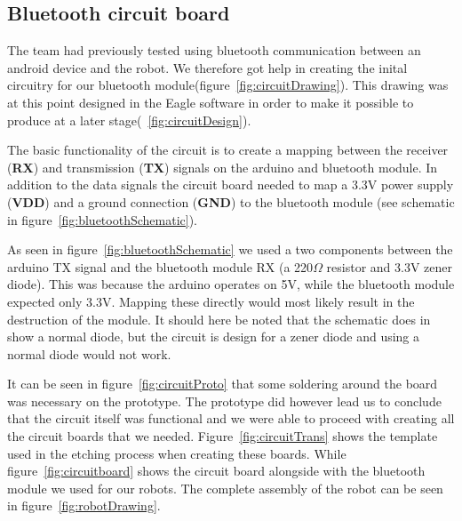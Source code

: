 \subsection*{Bluetooth circuit board}
The \chirp team had previously tested using bluetooth communication between an android device and the robot. We therefore got help in creating the inital circuitry for our bluetooth module(figure~\ref{fig:circuitDrawing}). This drawing was at this point designed in the Eagle software in order to make it possible to produce at a later stage(~\ref{fig:circuitDesign}). 

\bigskip\noindent
The basic functionality of the circuit is to create a mapping between the receiver (\textbf{RX}) and transmission (\textbf{TX}) signals on the arduino and bluetooth module. In addition to the data signals the circuit board needed to map a 3.3V power supply (\textbf{VDD}) and a ground connection (\textbf{GND}) to the bluetooth module (see schematic in figure~\ref{fig:bluetoothSchematic}).


\bigskip\noindent
As seen in figure~\ref{fig:bluetoothSchematic} we used a two components between the arduino TX signal and the bluetooth module RX (a 220$\Omega$ resistor and 3.3V zener diode). This was because the arduino operates on 5V, while the bluetooth module expected only 3.3V. Mapping these directly would most likely result in the destruction of the module. It should here be noted that the schematic does in show a normal diode, but the circuit is design for a zener diode and using a normal diode would not work.

\bigskip\noindent
It can be seen in figure~\ref{fig:circuitProto} that some soldering around the board was necessary on the prototype. The prototype did however lead us to conclude that the circuit itself was functional and we were able to proceed with creating all the circuit boards that we needed. 
Figure~\ref{fig:circuitTrans} shows the template used in the etching process when creating these boards. While figure~\ref{fig:circuitboard} shows the circuit board alongside with the bluetooth module we used for our robots. The complete assembly of the robot can be seen in figure~\ref{fig:robotDrawing}.

